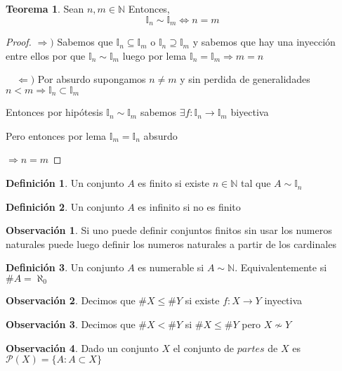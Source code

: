 \documentclass[12pt]{article}
\newcommand{\n}{\aleph_{0}}
\newcommand{\I}{\mathbb{I}}
\newcommand{\N}{\mathbb{N}}
\newcommand{\Ra}{\Rightarrow}
\newcommand{\ra}{\rightarrow}
\theoremstyle{definition}
\newtheorem{definition}{Definición}[section]
\newtheorem*{remark}{Observación}
\newtheorem{theorem}{Teorema}
\begin{document}
\begin{theorem}
  Sean $n,m \in \N$ Entonces, $$\I_{n} \sim \I_{m} \iff n = m$$

  \begin{proof}
  $\Ra)$ Sabemos que $\I_{n} \subseteq \I_{m}$ o $\I_{n} \supseteq \I_{m}$ y sabemos que hay una inyección entre ellos por que $\I_{n} \sim \I_{m}$ luego por lema $\I_{n} = \I_{m} \Ra m = n$

$\quad \Leftarrow ) $ Por absurdo supongamos $n \neq m $ y sin perdida de generalidades $n < m \Ra \I_{n} \subset \I_{m}$

Entonces por hipótesis $\I_{n} \sim \I_{m}$ sabemos $\exists f: \I_{n} \ra \I_{m}$ biyectiva 

Pero entonces por lema $\I_{m} = \I_{n}$ absurdo 

$\Ra n = m$ 
  \end{proof}
\end{theorem}


  \begin{definition}
    Un conjunto $A$ es finito si existe $n \in \N $ tal que $A \sim \I_{n}$
  \end{definition}

  \begin{definition}
    Un conjunto $A$ es infinito si no es finito
  \end{definition}

  \begin{remark}
    Si uno puede definir conjuntos finitos sin usar los numeros naturales puede luego definir los numeros naturales a partir de los cardinales 
  \end{remark}

  \begin{definition}
    Un conjunto $A$ es numerable si $A \sim \N$. Equivalentemente si $\# A = \n$
    
  \end{definition}

\begin{remark}
  Decimos que $\# X \leq \# Y$ si existe $f:X \ra Y$ inyectiva
\end{remark}
\begin{remark}
  Decimos que $\# X < \# Y$ si $\# X \leq \# Y$ pero $X \nsim Y$
\end{remark}

\begin{remark}
  Dado un conjunto $X$ el conjunto de $partes$ de $X$ es $\mathcal{P}(X) = \{A : A \subset X \}$
\end{remark}
\end{document}
